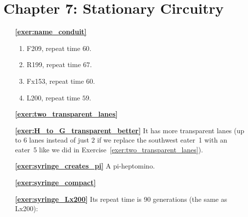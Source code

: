 \section*{Chapter 7: Stationary Circuitry}
\renewcommand{\chapterfolder}{stationary_circuitry/}

\begin{multicols}{2}
	\begin{itemize}[leftmargin=0em]
		\item[\bf\color{ocre}\sffamily\ref{exer:name_conduit}] \begin{enumerate}[leftmargin=1.5em,label=\bf\color{ocre}(\alph*)]
			\item F209, repeat time $60$.
			
			\item R199, repeat time $67$.
			
			\item Fx153, repeat time $60$.
			
			\item L200, repeat time $59$.\\
		\end{enumerate}
	

		\item[\bf\color{ocre}\sffamily\ref{exer:two_transparent_lanes}]  \\
		
		
		\item[\bf\color{ocre}\sffamily\ref{exer:H_to_G_transparent_better}] It has more transparent lanes (up to $6$ lanes instead of just $2$ if we replace the southwest eater~1 with an eater~5 like we did in Exercise~\ref{exer:two_transparent_lanes}).\\
			
	
		\item[\bf\color{ocre}\sffamily\ref{exer:syringe_creates_pi}] A pi-heptomino. \\
		
		
		\item[\bf\color{ocre}\sffamily\ref{exer:syringe_compact}]  \\
		
		
		
		\item[\bf\color{ocre}\sffamily\ref{exer:syringe_Lx200}] Its repeat time is 90 generations (the same as Lx200):
		\begin{center}
		\end{center}
		

\end{itemize}
\end{multicols}
